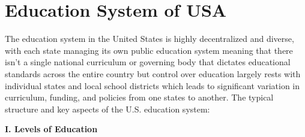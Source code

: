 

\section{Education System of USA}
The education system in the United States is highly decentralized and diverse, with each state managing its own public education system meaning that there isn't a single national curriculum or governing body that dictates educational standards across the entire country but control over education largely rests with individual states and local school districts which leads to significant variation in curriculum, funding, and policies from one states to another.
The typical structure and key aspects of the U.S. education system:

\textbf{I. Levels of Education}

